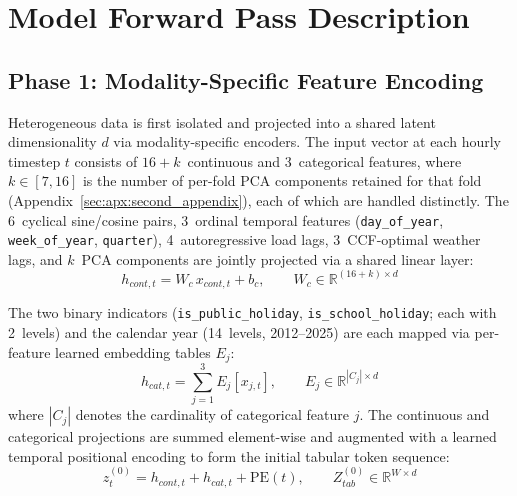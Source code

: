 \section{Model Forward Pass Description}
\label{sec:apx:third_appendinx}


\subsection{Phase 1: Modality-Specific Feature Encoding}

Heterogeneous data is first isolated and projected into a shared latent dimensionality $d$ via modality-specific encoders. The input vector at each hourly timestep $t$ consists of $16 + k$~continuous and 3~categorical features, where $k \in [7, 16]$ is the number of per-fold PCA components retained for that fold (Appendix~\ref{sec:apx:second_appendix}), each of which are handled distinctly. The 6~cyclical sine/cosine pairs, 3~ordinal temporal features (\texttt{day\_of\_year}, \texttt{week\_of\_year}, \texttt{quarter}), 4~autoregressive load lags, 3~CCF-optimal weather lags, and $k$~PCA components are jointly projected via a shared linear layer:
    \begin{equation}
        h_{cont,t} = W_c\, x_{cont,t} + b_c, \qquad
        W_c \in \mathbb{R}^{(16+k) \times d}
    \end{equation}

The two binary indicators (\texttt{is\_public\_holiday}, \texttt{is\_school\_holiday}; each with 2~levels) and the calendar year (14~levels, 2012--2025) are each mapped via per-feature learned embedding tables $E_j$:
    \begin{equation}
        h_{cat,t} = \sum_{j=1}^{3} E_j\!\left[x_{j,t}\right], \qquad
        E_j \in \mathbb{R}^{|C_j| \times d}
    \end{equation}
where $|C_j|$ denotes the cardinality of categorical feature $j$. The continuous and categorical projections are summed element-wise and augmented with a learned temporal positional encoding to form the initial tabular token sequence:
    \begin{equation}
        z_t^{(0)} = h_{cont,t} + h_{cat,t} + \text{PE}(t), \qquad
        Z_{tab}^{(0)} \in \mathbb{R}^{W \times d}
    \end{equation}

